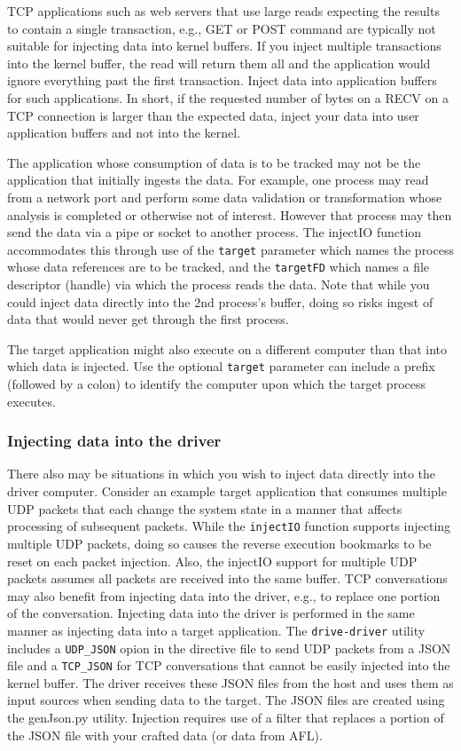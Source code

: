 \documentclass[titlepage]{article}
\begin{document}
TCP applications such as web servers that use large reads expecting the results to contain a single transaction, e.g., GET or POST command are typically
not suitable for injecting data into kernel buffers.  If you inject multiple transactions into the kernel buffer, the read will return them all and the
application would ignore everything past the first transaction.  Inject data into application buffers for such applications.
In short, if the requested number of bytes on a RECV on a TCP connection is larger than the expected data, inject your data into user application buffers
and not into the kernel.

The application whose consumption of data is to be tracked may not be the application that initially ingests the data.  For example, one
process may read from a network port and perform some data validation or transformation whose analysis is completed or otherwise not of interest.
However that process may then send the data via a pipe or socket to another process.  The injectIO function accommodates this through use of
the {\tt target} parameter which names the process whose data references are to be tracked, and the {\tt targetFD} which names 
a file descriptor (handle) via which
the process reads the data.  Note that while you could inject data directly into the 2nd process's buffer, doing so risks ingest of data that
would never get through the first process.

The target application might also execute on a different computer than that into which data is injected.  Use the optional {\tt target} parameter
can include a prefix (followed by a colon) to identify the computer upon which the target process executes.

\subsubsection{Injecting data into the driver}
There also may be situations in which you wish to inject data directly into the driver computer.  Consider an example target application that consumes
multiple UDP packets that each change the system state in a manner that affects processing of subsequent packets.  While the {\tt injectIO} function
supports injecting multiple UDP packets, doing so causes the reverse execution bookmarks to be reset on each packet injection.  Also, the injectIO
support for multiple UDP packets assumes all packets are received into the same buffer.  TCP conversations may also benefit from injecting data into the
driver, e.g., to replace one portion of the conversation.  Injecting data into the driver is performed in the same
manner as injecting data into a target application.  The {\tt drive-driver} utility includes a {\tt UDP\_JSON} opion in the directive file to send UDP packets from a
JSON file and a {\tt TCP\_JSON} for TCP conversations that cannot be easily injected into the kernel buffer. The driver receives these JSON files from the 
host and uses them as input sources when sending data to the target. 
The JSON files are created using the genJson.py utility.  Injection requires use of a filter that replaces a portion of the JSON file with your crafted data (or data from AFL).
\end{document}
